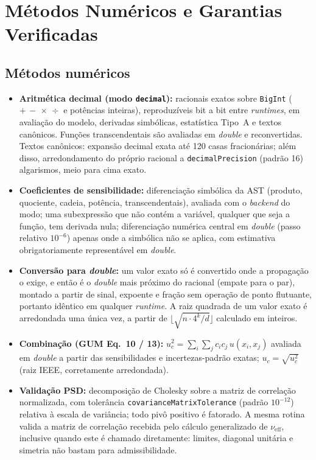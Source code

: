 \documentclass[11pt,a4paper]{article}
\begin{document}
\section{Métodos Numéricos e Garantias Verificadas}
\label{sec:metodos}

\subsection{Métodos numéricos}

\begin{itemize}
  \item \textbf{Aritmética decimal (modo \texttt{decimal}):} racionais exatos sobre \texttt{BigInt} (\(+\,-\,\times\,\div\) e potências inteiras), reproduzíveis bit a bit entre \emph{runtimes}, em avaliação do modelo, derivadas simbólicas, estatística Tipo~A e textos canônicos. Funções transcendentais são avaliadas em \emph{double} e reconvertidas. Textos canônicos: expansão decimal exata até 120 casas fracionárias; além disso, arredondamento do próprio racional a \texttt{decimalPrecision} (padrão 16) algarismos, meio para cima exato.
  \item \textbf{Coeficientes de sensibilidade:} diferenciação simbólica da AST (produto, quociente, cadeia, potência, transcendentais), avaliada com o \emph{backend} do modo; uma subexpressão que não contém a variável, qualquer que seja a função, tem derivada nula; diferenciação numérica central em \emph{double} (passo relativo \(10^{-6}\)) apenas onde a simbólica não se aplica, com estimativa obrigatoriamente representável em \emph{double}.
  \item \textbf{Conversão para \emph{double}:} um valor exato só é convertido onde a propagação o exige, e então é o \emph{double} mais próximo do racional (empate para o par), montado a partir de sinal, expoente e fração sem operação de ponto flutuante, portanto idêntico em qualquer \emph{runtime}. A raiz quadrada de um valor exato é arredondada uma única vez, a partir de \(\lfloor\sqrt{n \cdot 4^k / d}\rfloor\) calculado em inteiros.
  \item \textbf{Combinação (GUM Eq.~10 / 13):} \(u_c^2 = \sum_i \sum_j c_i c_j\, u(x_i, x_j)\) avaliada em \emph{double} a partir das sensibilidades e incertezas-padrão exatas; \(u_c = \sqrt{u_c^2}\) (raiz IEEE, corretamente arredondada).
  \item \textbf{Validação PSD:} decomposição de Cholesky sobre a matriz de correlação normalizada, com tolerância \texttt{covarianceMatrixTolerance} (padrão \(10^{-12}\)) relativa à escala de variância; todo pivô positivo é fatorado. A mesma rotina valida a matriz de correlação recebida pelo cálculo generalizado de \(\nu_{\text{eff}}\), inclusive quando este é chamado diretamente: limites, diagonal unitária e simetria não bastam para admissibilidade.

\end{itemize}
\end{document}
